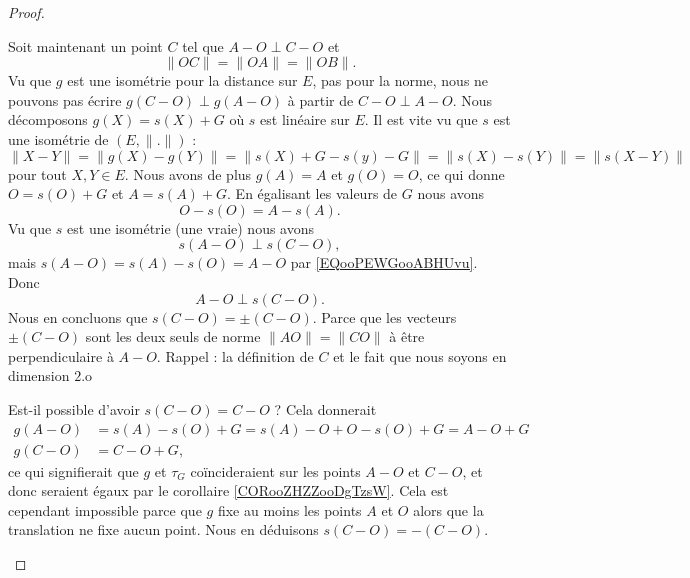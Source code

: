 \begin{proof}
\begin{subproof}
\begin{subproof}
            
            Soit maintenant un point \( C\) tel que \( A-O\perp C-O\) et 
            \begin{equation}
                \| OC \|=\| OA \|=\| OB \|.
            \end{equation}
            Vu que \( g\) est une isométrie pour la distance sur \( E\), pas pour la norme, nous ne pouvons pas écrire \( g(C-O)\perp g(A-O)\) à partir de \( C-O\perp A-O\). Nous décomposons \( g(X)=s(X)+G\) où \( s\) est linéaire sur \( E\). Il est vite vu que \( s\) est une isométrie de \( (E,\| . \|)\) :
            \begin{equation}
                \| X-Y \|=\| g(X)-g(Y) \|=\| s(X)+G-s(y)-G \|=\| s(X)-s(Y) \|=\| s(X-Y) \|
            \end{equation}
            pour tout \( X,Y\in E\). Nous avons de plus \( g(A)=A\) et \( g(O)=O\), ce qui donne \( O=s(O)+G\) et \( A=s(A)+G\). En égalisant les valeurs de \( G\) nous avons
            \begin{equation}        \label{EQooPEWGooABHUvu}
                O-s(O)=A-s(A).
            \end{equation}
            Vu que \( s\) est une isométrie (une vraie) nous avons
            \begin{equation}
                s(A-O)\perp s(C-O),
            \end{equation}
            mais \( s(A-O)=s(A)-s(O)=A-O\) par \eqref{EQooPEWGooABHUvu}. Donc
            \begin{equation}
                A-O\perp s(C-O).
            \end{equation}
            Nous en concluons que \( s(C-O)=\pm (C-O)\). Parce que les vecteurs \( \pm(C-O)\) sont les deux seuls de norme \( \| AO \| =\| CO \|\) à être perpendiculaire à \( A-O\). Rappel : la définition de \( C\) et le fait que nous soyons en dimension \( 2\).o
            
            Est-il possible d'avoir \( s(C-O)=C-O\) ? Cela donnerait
            \begin{subequations}
                \begin{align}
                    g(A-O)&=s(A)-s(O)+G=s(A)-O+O-s(O)+G=A-O+G\\
                    g(C-O)&=C-O+G,
                \end{align}
            \end{subequations}
            ce qui signifierait que \( g\) et \( \tau_G\) coïncideraient sur les points \( A-O\) et \( C-O\), et donc seraient égaux par le corollaire \ref{CORooZHZZooDgTzsW}. Cela est cependant impossible parce que \( g\) fixe au moins les points \( A\) et \( O\) alors que la translation ne fixe aucun point. Nous en déduisons \( s(C-O)=-(C-O)\).


\end{subproof}
\end{subproof}
\end{proof}
